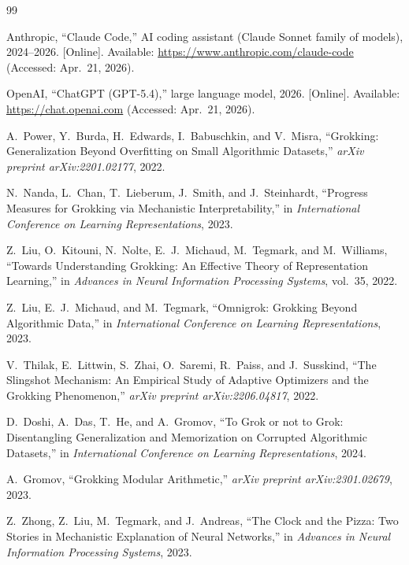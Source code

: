 \documentclass[12pt,openany,oneside,a4paper]{book}
\begin{document}
{\renewcommand{\bibname}{References}%
\begin{thebibliography}{99}

Anthropic, ``Claude Code,'' AI coding assistant (Claude Sonnet
family of models), 2024--2026.
[Online]. Available: \url{https://www.anthropic.com/claude-code}
(Accessed: Apr.~21, 2026).

OpenAI, ``ChatGPT (GPT-5.4),'' large language model, 2026.
[Online]. Available: \url{https://chat.openai.com}
(Accessed: Apr.~21, 2026).

A.~Power, Y.~Burda, H.~Edwards, I.~Babuschkin, and V.~Misra,
``Grokking: Generalization Beyond Overfitting on Small Algorithmic
Datasets,'' \textit{arXiv preprint arXiv:2201.02177}, 2022.

N.~Nanda, L.~Chan, T.~Lieberum, J.~Smith, and J.~Steinhardt,
``Progress Measures for Grokking via Mechanistic Interpretability,''
in \textit{International Conference on Learning Representations}, 2023.

Z.~Liu, O.~Kitouni, N.~Nolte, E.~J.~Michaud, M.~Tegmark, and
M.~Williams, ``Towards Understanding Grokking: An Effective Theory
of Representation Learning,'' in \textit{Advances in Neural
Information Processing Systems}, vol.~35, 2022.

Z.~Liu, E.~J.~Michaud, and M.~Tegmark,
``Omnigrok: Grokking Beyond Algorithmic Data,''
in \textit{International Conference on Learning Representations},
2023.

V.~Thilak, E.~Littwin, S.~Zhai, O.~Saremi, R.~Paiss, and J.~Susskind,
``The Slingshot Mechanism: An Empirical Study of Adaptive Optimizers
and the Grokking Phenomenon,''
\textit{arXiv preprint arXiv:2206.04817}, 2022.

D.~Doshi, A.~Das, T.~He, and A.~Gromov,
``To Grok or not to Grok: Disentangling Generalization and Memorization
on Corrupted Algorithmic Datasets,''
in \textit{International Conference on Learning Representations}, 2024.

A.~Gromov,
``Grokking Modular Arithmetic,''
\textit{arXiv preprint arXiv:2301.02679}, 2023.

Z.~Zhong, Z.~Liu, M.~Tegmark, and J.~Andreas,
``The Clock and the Pizza: Two Stories in Mechanistic Explanation
of Neural Networks,''
in \textit{Advances in Neural Information Processing Systems}, 2023.


\end{thebibliography}}
\end{document}
